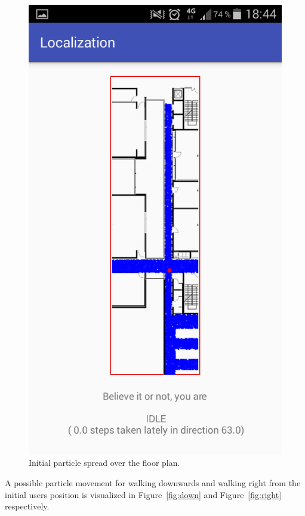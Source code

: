\documentclass[conference]{IEEEtran}
\begin{document}
\begin{figure}[!htp]
\begin{center}
\includegraphics[width=0.7\linewidth]{fig/initial}
\caption{Initial particle spread over the floor plan.}\label{fig:initial}
\end{center}
\end{figure}

A possible particle movement for walking downwards and walking right from the initial users position is visualized in Figure~\ref{fig:down} and Figure~\ref{fig:right} respectively.
\end{document}
